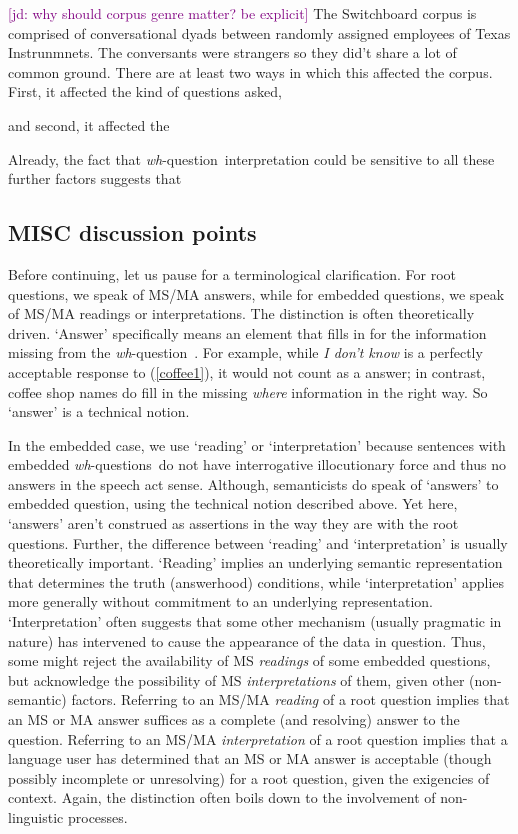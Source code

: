 \documentclass[12pt,letterpaper,table,svgnames,dvipsnames]{article}
\newcommand{\jd}[1]{\textcolor{Purple}{[jd: #1]}}
\newcommand{\whq}{\emph{wh}-question~}
\newcommand{\whqs}{\emph{wh}-questions~}
\begin{document}
\jd{why should corpus genre matter? be explicit}
The Switchboard corpus is comprised of conversational dyads between randomly assigned employees of Texas Instrunmnets. The conversants were strangers so they did't share a lot of common ground. There are at least two ways in which this affected the corpus. First, it affected the kind of questions asked, 

and second, it affected the 

Already, the fact that \whq interpretation could be sensitive to all these further factors suggests that 

\subsection{MISC discussion points}

Before continuing, let us pause for a terminological clarification. For root questions, we speak of MS/MA answers, while for embedded questions, we speak of MS/MA readings or interpretations. The distinction is often theoretically driven. `Answer' specifically means an element that fills in for the information missing from the \whq. For example, while \emph{I don't know} is a perfectly acceptable response to (\ref{coffee1}), it would not count as a answer; in contrast, coffee shop names do fill in the missing \emph{where} information in the right way. So `answer' is a technical notion.

In the embedded case, we use `reading' or `interpretation' because sentences with embedded \whqs do not have interrogative illocutionary force and thus no answers in the speech act sense. Although, semanticists do speak of `answers' to embedded question, using the technical notion described above. Yet here, `answers' aren't construed as assertions in the way they are with the root questions. Further, the difference between `reading' and `interpretation' is usually theoretically important. `Reading' implies an underlying semantic representation that determines the truth (answerhood) conditions, while `interpretation' applies more generally without commitment to an underlying representation. `Interpretation' often suggests that some other mechanism (usually pragmatic in nature) has intervened to cause the appearance of the data in question. Thus, some might reject the availability of MS \emph{readings} of some embedded questions, but acknowledge the possibility of MS \emph{interpretations} of them, given other (non-semantic) factors. Referring to an MS/MA \emph{reading} of a root question implies that an MS or MA answer suffices as a complete (and resolving) answer to the question. Referring to an MS/MA \emph{interpretation} of a root question implies that a language user has determined that an MS or MA answer is acceptable (though possibly incomplete or unresolving) for a root question, given the exigencies of context. Again, the distinction often boils down to the involvement of non-linguistic processes. 
\end{document}
